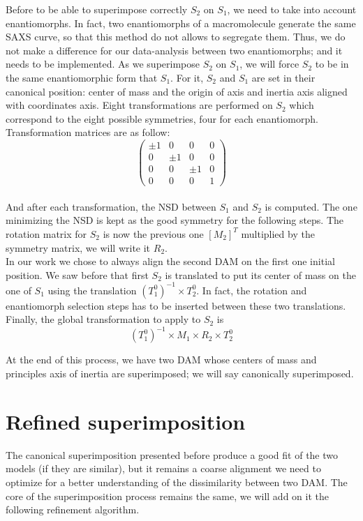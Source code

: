 \documentclass[a4paper, 11pt]{report}
\begin{document}
Before to be able to superimpose correctly $S_{2}$ on $S_{1}$, we need 
to take into account enantiomorphs. 
In fact, two enantiomorphs of a macromolecule generate the same SAXS 
curve, so that this method do not allows to segregate them. 
Thus, we do not make a difference for our data-analysis between two 
enantiomorphs; and it needs to be implemented. 
As we superimpose $S_{2}$ on $S_{1}$, we will force $S_{2}$ to be in 
the same enantiomorphic form that $S_{1}$. 
For it, $S_{2}$ and $S_{1}$ are set in their canonical position: 
center of mass and the origin of axis and inertia axis aligned with 
coordinates axis. 
Eight transformations are performed on $S_{2}$ which correspond to the 
eight possible symmetries, four for each enantiomorph. 
Transformation matrices are as follow:
\[
\begin{pmatrix}
 \pm 1 & 0 & 0 & 0 \\
 0 & \pm 1 & 0 & 0 \\
 0 & 0 & \pm 1 & 0 \\
 0 & 0 & 0 & 1
\end{pmatrix}
\]\\
And after each transformation, the NSD between $S_{1}$ and $S_{2}$ is 
computed. 
The one minimizing the NSD is kept as the good symmetry for the 
following steps. 
The rotation matrix for $S_{2}$ is now the previous one $[M_{2}]^T$ 
multiplied by the symmetry matrix, we will write it $R_{2}$.\\

In our work we chose to always align the second DAM on the first one 
initial position. 
We saw before that first $S_{2}$ is translated to put its center of 
mass on the one of $S_{1}$ using the translation 
$(T_{1}^0)^{-1} \times T_{2}^0$. 
In fact, the rotation and enantiomorph selection steps has to be 
inserted between these two translations. 
Finally, the global transformation to apply to $S_{2}$ is 
\[(T_{1}^0)^{-1} \times M_{1} \times R_{2} \times T_{2}^0\]

At the end of this process, we have two DAM whose centers of mass and 
principles axis of inertia are superimposed; we will say canonically 
superimposed.

\section{Refined superimposition}

The canonical superimposition presented before produce a good fit of 
the two models (if they are similar), but it remains a coarse 
alignment we need to optimize for a better understanding of the 
dissimilarity between two DAM. 
The core of the superimposition process remains the same, we will add 
on it the following refinement algorithm.\\
 
\end{document}
